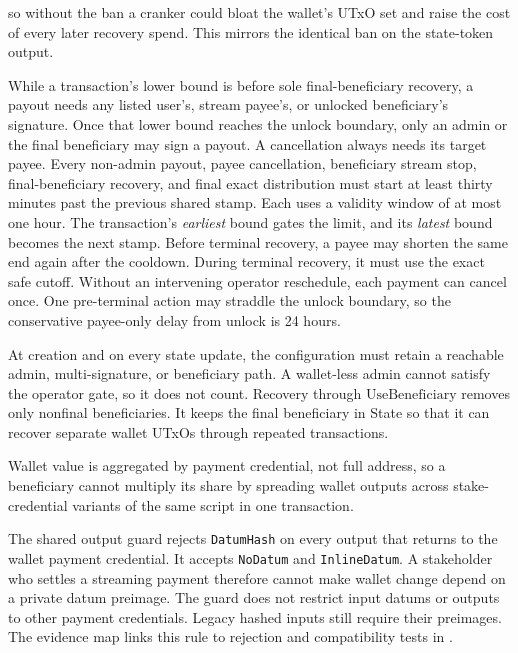 \documentclass[11pt,DIV=11,parskip=half-]{scrartcl}
\begin{document}
\begin{description}[leftmargin=1.4em,style=nextline]
so without the ban a cranker could bloat the wallet's UTxO set and raise the cost of every later recovery spend. This mirrors the identical ban on the state-token output.
\item[Settlement cadence.] While a transaction's lower bound is before sole final-beneficiary recovery, a payout needs any listed user's, stream payee's, or unlocked beneficiary's signature. Once that lower bound reaches the unlock boundary, only an admin or the final beneficiary may sign a payout. A cancellation always needs its target payee. Every non-admin payout, payee cancellation, beneficiary stream stop, final-beneficiary recovery, and final exact distribution must start at least thirty minutes past the previous shared stamp. Each uses a validity window of at most one hour. The transaction's \emph{earliest} bound gates the limit, and its \emph{latest} bound becomes the next stamp. Before terminal recovery, a payee may shorten the same end again after the cooldown. During terminal recovery, it must use the exact safe cutoff. Without an intervening operator reschedule, each payment can cancel once. One pre-terminal action may straddle the unlock boundary, so the conservative payee-only delay from unlock is 24 hours.
\item[Recovery reachability.] At creation and on every state update, the configuration must retain a reachable admin, multi-signature, or beneficiary path. A wallet-less admin cannot satisfy the operator gate, so it does not count. Recovery through $\mathrm{UseBeneficiary}$ removes only nonfinal beneficiaries. It keeps the final beneficiary in State so that it can recover separate wallet UTxOs through repeated transactions.
\item[Credential aggregation.] Wallet value is aggregated by payment credential, not full address, so a beneficiary cannot multiply its share by spreading wallet outputs across stake-credential variants of the same script in one transaction.
\item[Continuing wallet output shape.] The shared output guard rejects \texttt{DatumHash} on every output that returns to the wallet payment credential. It accepts \texttt{NoDatum} and \texttt{InlineDatum}. A stakeholder who settles a streaming payment therefore cannot make wallet change depend on a private datum preimage. The guard does not restrict input datums or outputs to other payment credentials. Legacy hashed inputs still require their preimages. The evidence map links this rule to rejection and compatibility tests in .

\end{description}
\end{document}
